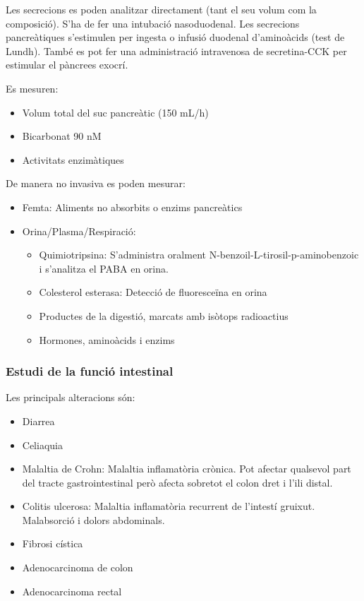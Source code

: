 Les secrecions es poden analitzar directament (tant el seu volum com
la composició). S'ha de fer una intubació nasoduodenal. Les secrecions
pancreàtiques s'estimulen per ingesta o infusió duodenal d'aminoàcids
(test de Lundh). També es pot fer una administració intravenosa de
secretina-CCK per estimular el pàncrees exocrí.

Es mesuren:
\begin{itemize}
\item Volum total del suc pancreàtic (150 mL/h)
\item Bicarbonat 90 nM
\item Activitats enzimàtiques
\end{itemize}

De manera no invasiva es poden mesurar:
\begin{itemize}
\item Femta: Aliments no absorbits o enzims pancreàtics
\item Orina/Plasma/Respiració:
  \begin{itemize}
  \item Quimiotripsina: S'administra oralment
    N-benzoil-L-tirosil-p-aminobenzoic i s'analitza el PABA en orina.
  \item Colesterol esterasa: Detecció de fluoresceïna en orina
  \item Productes de la digestió, marcats amb isòtops radioactius
  \item Hormones, aminoàcids i enzims
  \end{itemize}
\end{itemize}

\subsubsection{Estudi de la funció intestinal}
\label{sec:estudi-de-la-1}

Les principals alteracions són:
\begin{itemize}
\item Diarrea
\item Celiaquia
\item Malaltia de Crohn: Malaltia inflamatòria crònica. Pot afectar
  qualsevol part del tracte gastrointestinal però afecta sobretot el
  colon dret i l'ili distal.
\item Colitis ulcerosa: Malaltia inflamatòria recurrent de l'intestí
  gruixut. Malabsorció i dolors abdominals.
\item Fibrosi cística
\item Adenocarcinoma de colon
\item Adenocarcinoma rectal
\end{itemize}

